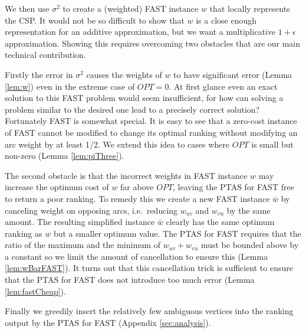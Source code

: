 \documentclass[dvips,11pt,letter]{article}
\newcommand{\fast}{\textsc{FAST}}
\begin{document}
We then use $\sigma^2$ to create a (weighted) \fast{} instance $w$ that locally represents the CSP. It would not be so difficult to show that $w$ is a close enough representation for an additive approximation, but we want a multiplicative $1+\epsilon$ approximation. Showing this requires overcoming two obstacles that are our main technical contribution.

Firstly the error in $\sigma^2$ causes the weights of $w$ to have significant error (Lemma \ref{lem:w}) even in the extreme case of $OPT = 0$. At first glance even an exact solution to this \fast{} problem would seem insufficient, for how can solving a problem similar to the desired one lead to a precisely correct solution? Fortunately \fast{} is somewhat special. It is easy to see that a zero-cost instance of \fast{} cannot be modified to change its optimal ranking without modifying an arc weight by at least 1/2. We extend this idea to cases where $OPT$ is small but non-zero (Lemma \ref{lem:piThree}).

The second obstacle is that the incorrect weights in FAST instance $w$ may increase the optimum cost of $w$ far above $OPT$, leaving the PTAS for FAST free to return a poor ranking. To remedy this we create a new FAST instance $\bar w$ by canceling weight on opposing arcs, i.e.\ reducing $w_{uv}$ and $w_{vu}$ by the same amount. The resulting simplified instance $\bar w$ clearly has the same optimum ranking as $w$ but a smaller optimum value. The PTAS for FAST requires that the ratio of the maximum and the minimum of $w_{uv} + w_{vu}$ must be bounded above by a constant so we limit the amount of cancellation to ensure this (Lemma \ref{lem:wBarFAST}). It turns out that this cancellation trick is sufficient to ensure that the PTAS for FAST does not introduce too much error (Lemma \ref{lem:fastCheap}).

Finally we greedily insert the relatively few ambiguous vertices into the ranking output by the PTAS for \fast{} \cite{mathieu09fast} (Appendix \ref{sec:analysis}).

\bigskip
\end{document}
